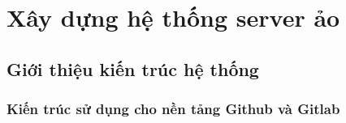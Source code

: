 \chapter{Xây dựng hệ thống server ảo}

\section {Giới thiệu kiến trúc hệ thống}

\subsection{Kiến trúc sử dụng cho nền tảng Github và Gitlab}
%
%
%
%
%
%
%
%	
